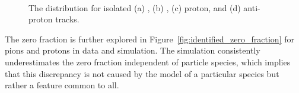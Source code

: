 \begin{figure}[h]
{}
~
\caption{The \ep distribution for isolated (a) \pip, (b) \pim, (c) proton, and (d) anti-proton tracks.}
\label{fig:identified_eoverp}
\end{figure}

The zero fraction is further explored in Figure~\ref{fig:identified_zero_fraction} for pions and protons in data and simulation. 
The simulation consistently underestimates the zero fraction independent of particle species, which implies that this discrepancy is not caused by the model of a particular species but rather a feature common to all.

